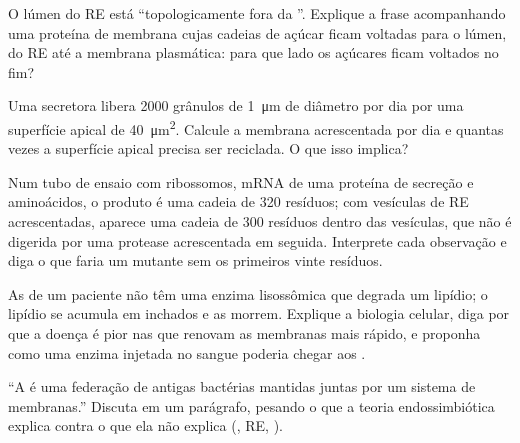 \begin{exercise}[$\star\star$]\label{exo:b1:eukaryotic-cell:8}
O lúmen do RE está ``topologicamente fora da ''. Explique a frase
acompanhando uma proteína de membrana cujas cadeias de açúcar ficam
voltadas para o lúmen, do RE até a membrana plasmática: para que lado os
açúcares ficam voltados no fim?
\end{exercise}

\begin{exercise}[$\star\star$]\label{exo:b1:eukaryotic-cell:9}
Uma  secretora libera \qty{2000}{} grânulos de \qty{1}{\micro m}
de diâmetro por dia por uma superfície apical de \qty{40}{\micro m^2}.
Calcule a membrana acrescentada por dia e quantas vezes a superfície
apical precisa ser reciclada. O que isso implica?
\end{exercise}

\begin{exercise}[$\star\star\star$]\label{exo:b1:eukaryotic-cell:10}
Num tubo de ensaio com ribossomos, mRNA de uma proteína de secreção e
aminoácidos, o produto é uma cadeia de \qty{320}{} resíduos; com
vesículas de RE acrescentadas, aparece uma cadeia de \qty{300}{}
resíduos dentro das vesículas, que não é digerida por uma protease
acrescentada em seguida. Interprete cada observação e diga o que faria
um mutante sem os primeiros vinte resíduos.
\end{exercise}

\begin{exercise}[$\star\star\star$]\label{exo:b1:eukaryotic-cell:11}
As  de um paciente não têm uma enzima lisossômica que degrada um
lipídio; o lipídio se acumula em  inchados e as 
morrem. Explique a biologia celular, diga por que a doença é pior nas
 que renovam as membranas mais rápido, e proponha como uma enzima
injetada no sangue poderia chegar aos .
\end{exercise}

\begin{exercise}[$\star\star\star$]\label{exo:b1:eukaryotic-cell:12}
``A  é uma federação de antigas bactérias mantidas
juntas por um sistema de membranas.'' Discuta em um parágrafo, pesando o
que a teoria endossimbiótica explica contra o que ela não explica
(, RE, ).
\end{exercise}

